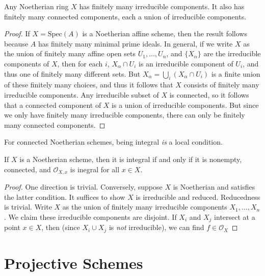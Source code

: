 \begin{theorem}
    Any Noetherian ring $X$ has finitely many irreducible components. It also has finitely many connected components, each a union of irreducible components.
\end{theorem}
\begin{proof}
    If $X = \text{Spec}(A)$ is a Noetherian affine scheme, then the result follows because $A$ has finitely many minimal prime ideals. In general, if we write $X$ as the union of finitely many affine open sets $U_1,\dots,U_n$, and $\{ X_\alpha \}$ are the irreducible components of $X$, then for each $i$, $X_\alpha \cap U_i$ is an irreducible component of $U_i$, and thus one of finitely many different sets. But $X_\alpha = \bigcup_i (X_\alpha \cap U_i)$ is a finite union of these finitely many choices, and thus it follows that $X$ consists of finitely many irreducible components. Any irreducible subset of $X$ is connected, so it follows that a connected component of $X$ is a union of irreducible components. But since we only have finitely many irreducible components, there can only be finitely many connected components.
\end{proof}

For connected Noetherian schemes, being integral \emph{is} a local condition.

\begin{theorem}
    If $X$ is a Noetherian scheme, then it is integral if and only if it is nonempty, connected, and $\mathcal{O}_{X,x}$ is inegral for all $x \in X$.
\end{theorem}
\begin{proof}
    One direction is trivial. Conversely, suppose $X$ is Noetherian and satisfies the latter condition. It suffices to show $X$ is irreducible and reduced. Reducedness is trivial. Write $X$ as the union of finitely many irreducible components $X_1,\dots,X_n$. We claim these irreducible components are disjoint. If $X_i$ and $X_j$ intersect at a point $x \in X$, then (since $X_i \cup X_j$ is \emph{not} irreducible), we can find $f \in \mathcal{O}_X$
\end{proof}


















\section{Projective Schemes}
 
